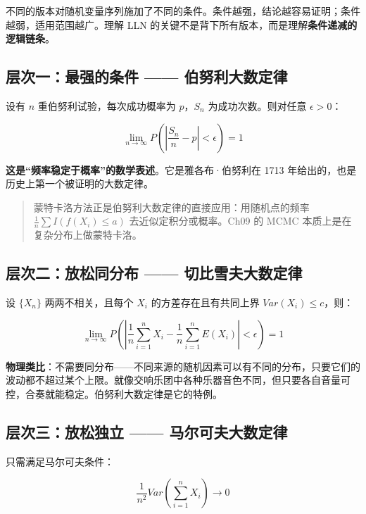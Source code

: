 \documentclass[
]{book}
\begin{document}
不同的版本对随机变量序列施加了不同的条件。条件越强，结论越容易证明；条件越弱，适用范围越广。理解 LLN 的关键不是背下所有版本，而是理解\textbf{条件递减的逻辑链条}。

\subsection{层次一：最强的条件 ------ 伯努利大数定律}\label{ux5c42ux6b21ux4e00ux6700ux5f3aux7684ux6761ux4ef6-ux4f2fux52aaux5229ux5927ux6570ux5b9aux5f8b}

设有 \(n\) 重伯努利试验，每次成功概率为 \(p\)，\(S_n\) 为成功次数。则对任意 \(\epsilon > 0\)：

\[\lim_{n \to \infty} P\left(\left|\frac{S_n}{n} - p\right| < \epsilon\right) = 1\]

\textbf{这是``频率稳定于概率''的数学表述}。它是雅各布·伯努利在 1713 年给出的，也是历史上第一个被证明的大数定律。

\begin{quote}
蒙特卡洛方法正是伯努利大数定律的直接应用：用随机点的频率 \(\frac{1}{n}\sum I(f(X_i) \leq a)\) 去近似定积分或概率。Ch09 的 MCMC 本质上是在复杂分布上做蒙特卡洛。
\end{quote}

\subsection{层次二：放松同分布 ------ 切比雪夫大数定律}\label{ux5c42ux6b21ux4e8cux653eux677eux540cux5206ux5e03-ux5207ux6bd4ux96eaux592bux5927ux6570ux5b9aux5f8b}

设 \(\{X_n\}\) 两两不相关，且每个 \(X_i\) 的方差存在且有共同上界 \(Var(X_i) \leq c\)，则：

\[\lim_{n \to \infty} P\left(\left|\frac{1}{n}\sum_{i=1}^n X_i - \frac{1}{n}\sum_{i=1}^n E(X_i)\right| < \epsilon\right) = 1\]

\textbf{物理类比}：不需要同分布------不同来源的随机因素可以有不同的分布，只要它们的波动都不超过某个上限。就像交响乐团中各种乐器音色不同，但只要各自音量可控，合奏就能稳定。伯努利大数定律是它的特例。

\subsection{层次三：放松独立 ------ 马尔可夫大数定律}\label{ux5c42ux6b21ux4e09ux653eux677eux72ecux7acb-ux9a6cux5c14ux53efux592bux5927ux6570ux5b9aux5f8b}

只需满足马尔可夫条件：

\[\frac{1}{n^2} Var\left(\sum_{i=1}^n X_i\right) \to 0\]
\end{document}
